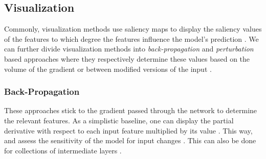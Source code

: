 \subsection{Visualization}
Commonly, visualization methods use saliency maps to display the saliency values of the features \ie to which degree the features influence the model's prediction \citep{xie2020explainable}. We can further divide visualization methods into \emph{back-propagation} and \emph{perturbation} based approaches where they respectively determine these values based on the volume of the gradient or between modified versions of the input \citep{xie2020explainable}. 

\subsubsection{Back-Propagation}
These approaches stick to the gradient passed through the network to determine the relevant features. As a simplistic baseline, one can display the partial derivative with respect to each input feature multiplied by its value \citep{xie2020explainable}. This way,  \citet{SimonyanVZ13} and \citet{SpringenbergDBR14} assess the sensitivity of the model for input changes \citep{xie2020explainable}. This can also be done for collections of intermediate layers \citep{ShrikumarGK17, MontavonLBSM17, Bach2015, ZeilerF14}.

